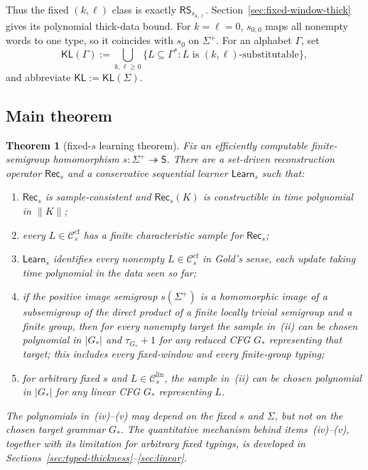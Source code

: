 \documentclass[11pt,a4paper]{article}
\newtheorem{theorem}{Theorem}[section]
\theoremstyle{remark}
\theoremstyle{plain}
\newcommand{\cf}{\mathrm{cf}}
\newcommand{\lin}{\mathrm{lin}}
\newcommand{\Ccf}[1]{\mathcal C_{#1}^{\cf}}
\newcommand{\Clin}[1]{\mathcal C_{#1}^{\lin}}
\begin{document}
Thus the fixed $(k,\ell)$ class is exactly
$\mathsf{RS}_{s_{k,\ell}}$.  Section~\ref{sec:fixed-window-thick} gives
its polynomial thick-data bound.  For $k=\ell=0$,
$s_{0,0}$ maps all nonempty words to one type,
so it coincides with $s_0$ on $\Sigma^+$.  For an alphabet
$\Gamma$, set
\[
\mathsf{KL}(\Gamma):=
\bigcup_{k,\ell\ge0}
\{L\subseteq\Gamma^*:L\text{ is $(k,\ell)$-substitutable}\},
\]
and abbreviate $\mathsf{KL}:=\mathsf{KL}(\Sigma)$.

\subsection{Main theorem}

\begin{theorem}[fixed-$s$ learning theorem]\label{thm:main}
Fix an efficiently computable finite-semigroup homomorphism
$s:\Sigma^+\twoheadrightarrow\mathsf S$.  There are a set-driven reconstruction operator $\mathsf{Rec}_s$ and a
conservative sequential learner $\mathsf{Learn}_s$ such that:
\begin{enumerate}[label=\textup{(\roman*)},nosep]
\item $\mathsf{Rec}_s$ is sample-consistent and $\mathsf{Rec}_s(K)$ is
constructible in time polynomial in $\|K\|$;
\item every $L\in\Ccf{s}$ has a finite characteristic sample for
$\mathsf{Rec}_s$;
\item $\mathsf{Learn}_s$ identifies every nonempty $L\in\Ccf{s}$ in Gold's
sense, each update taking time polynomial in the data seen so far;
\item if the positive image semigroup $s(\Sigma^+)$ is a
homomorphic image of a subsemigroup of the direct product of
a finite locally trivial semigroup and a finite group,
then for every nonempty target the sample in~(ii) can be chosen polynomial in $|G_*|$
and $\tau_{G_*}+1$ for any reduced CFG $G_*$ representing that target;
this includes every fixed-window and every finite-group typing;
\item for arbitrary fixed $s$ and $L\in\Clin{s}$, the sample in~(ii) can
be chosen polynomial in $|G_*|$ for any linear CFG $G_*$ representing $L$.
\end{enumerate}
The polynomials in~(iv)--(v) may depend on the fixed $s$ and $\Sigma$,
but not on the chosen target grammar $G_*$. The quantitative mechanism behind items~(iv)--(v), together with its
limitation for arbitrary fixed typings, is developed in
Sections~\ref{sec:typed-thickness}--\ref{sec:linear}.
\end{theorem}
\end{document}
